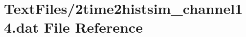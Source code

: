 \hypertarget{2time2histsim__channel14_8dat}{}\section{Text\+Files/2time2histsim\+\_\+channel14.dat File Reference}
\label{2time2histsim__channel14_8dat}
